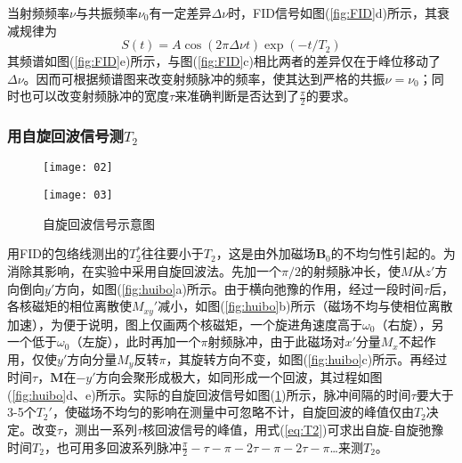 \documentclass[aps,pre,12pt,preprint,onecolumn,showpacs,showkeys]{revtex4-1}
\begin{document}
            当射频频率$\nu$与共振频率$\nu_0$有一定差异$\Delta \nu$时，FID信号如图(\ref{fig:FID}d)所示，其衰减规律为
            \begin{equation}
                S(t)=A\cos(2\pi \Delta \nu t)\exp(-t/T_2)
            \end{equation}
            其频谱如图(\ref{fig:FID}e)所示，与图(\ref{fig:FID}c)相比两者的差异仅在于峰位移动了$\Delta \nu$。因而可根据频谱图来改变射频脉冲的频率，使其达到严格的共振$\nu=\nu_0$；同时也可以改变射频脉冲的宽度$\tau$来准确判断是否达到了$\frac{\pi}{2}$的要求。
        \subsubsection{用自旋回波信号测$T_2$}
            
            \begin{figure}[ht]
                \begin{minipage}{.6\textwidth}
                    \centering
                    \texttt{[image: 02]}
                    \caption{\label{fig:huibo}%
                    自旋回波原理图}
                \end{minipage}%
                \begin{minipage}{0.4\textwidth}
                    \centering
                    \texttt{[image: 03]}
                    \caption{\label{fig:huibo2}%
                    自旋回波信号示意图}
                \end{minipage}
                
            \end{figure}
            用FID的包络线测出的$T_2^*$往往要小于$T_2$，这是由外加磁场$\bm B_0$的不均匀性引起的。为消除其影响，在实验中采用自旋回波法。先加一个$\pi/2$的射频脉冲长，使$M$从$z'$方向倒向$y'$方向，如图(\ref{fig:huibo}a)所示。由于横向弛豫的作用，经过一段时间$\tau$后，各核磁矩的相位离散使$M_{xy}'$减小，如图(\ref{fig:huibo}b)所示（磁场不均与使相位离散加速），为便于说明，图上仅画两个核磁矩，一个旋进角速度高于$\omega_0$（右旋），另一个低于$\omega_0$（左旋），此时再加一个$\pi$射频脉冲，由于此磁场对$x'$分量$M_x$不起作用，仅使$y'$方向分量$M_y$反转$\pi$，其旋转方向不变，如图(\ref{fig:huibo}c)所示。再经过时间$\tau$，$\bm{M}$在$-y'$方向会聚形成极大，如同形成一个回波，其过程如图(\ref{fig:huibo}d、e)所示。实际的自旋回波信号如图(\ref{fig:huibo2})所示，脉冲间隔的时间$\tau$要大于3-5个$T_2'$，使磁场不均匀的影响在测量中可忽略不计，自旋回波的峰值仅由$T_2$决定。改变$\tau$，测出一系列$\tau$核回波信号的峰值，用式(\ref{eq:T2})可求出自旋-自旋弛豫时间$T_2$，也可用多回波系列脉冲$\frac{\pi}{2}-\tau-\pi-2\tau-\pi-2\tau-\pi$…来测$T_2$。
\end{document}
